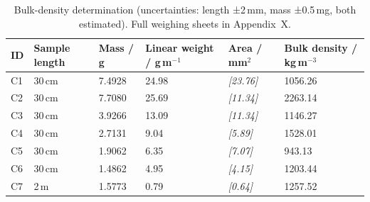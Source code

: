 \begin{table}[H]
  \centering
  \begin{tabularx}{\textwidth}{l l l l l X}
    \toprule
    \textbf{ID} & \textbf{Sample length} & \textbf{Mass / g} &
    \textbf{Linear weight / g\,m$^{-1}$} & \textbf{Area / mm$^2$} &
    \textbf{Bulk density / kg\,m$^{-3}$} \\
    \midrule
    C1 & 30\,cm & 7.4928 & 24.98 & \textit{[23.76]} & 1056.26 \\
    C2 & 30\,cm & 7.7080 & 25.69 & \textit{[11.34]} & 2263.14 \\
    C3 & 30\,cm & 3.9266 & 13.09 & \textit{[11.34]} & 1146.27 \\
    C4 & 30\,cm & 2.7131 & 9.04  & \textit{[5.89]}  & 1528.01 \\
    C5 & 30\,cm & 1.9062 & 6.35  & \textit{[7.07]}  & 943.13 \\
    C6 & 30\,cm & 1.4862 & 4.95  & \textit{[4.15]}  & 1203.44 \\
    C7 & 2\,m   & 1.5773 & 0.79  & \textit{[0.64]}  & 1257.52 \\
    \bottomrule
  \end{tabularx}
  \caption[Bulk-density determination]{Bulk-density determination
    (uncertainties: length ±2\,mm, mass ±0.5\,mg, both estimated). Full
    weighing sheets in Appendix~X. %
    }
  \label{tab:methods:density}
\end{table}

